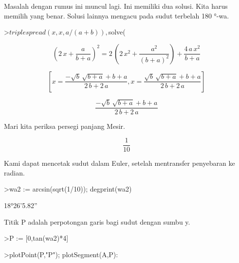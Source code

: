 \documentclass[a4paper,10pt]{article}
\begin{document}
\begin{eulernotebook}
\begin{eulercomment}
\begin{eulercomment}
\begin{eulercomment}
Masalah dengan rumus ini muncul lagi. Ini memiliki dua solusi. Kita
harus memilih yang benar. Solusi lainnya mengacu pada sudut terbelah
180 °-wa.
\end{eulercomment}
\begin{eulerprompt}
>$triplespread(x,x,a/(a+b)), $solve(%
\end{eulerprompt}
\begin{eulerformula}
\[
\left(2\,x+\frac{a}{b+a}\right)^2=2\,\left(2\,x^2+\frac{a^2}{\left(
 b+a\right)^2}\right)+\frac{4\,a\,x^2}{b+a}
\]
\end{eulerformula}
\begin{eulerformula}
\[
\left[ x=\frac{-\sqrt{b}\,\sqrt{b+a}+b+a}{2\,b+2\,a} , x=\frac{
 \sqrt{b}\,\sqrt{b+a}+b+a}{2\,b+2\,a} \right] 
\]
\end{eulerformula}
\begin{eulerformula}
\[
\frac{-\sqrt{b}\,\sqrt{b+a}+b+a}{2\,b+2\,a}
\]
\end{eulerformula}
\begin{eulercomment}
Mari kita periksa persegi panjang Mesir.
\end{eulercomment}
\begin{eulerformula}
\[
\frac{1}{10}
\]
\end{eulerformula}
\begin{eulercomment}
Kami dapat mencetak sudut dalam Euler, setelah mentransfer penyebaran
ke radian.
\end{eulercomment}
\begin{eulerprompt}
>wa2 := arcsin(sqrt(1/10)); degprint(wa2)
\end{eulerprompt}
\begin{euleroutput}
  18°26'5.82''
\end{euleroutput}
\begin{eulercomment}
Titik P adalah perpotongan garis bagi sudut dengan sumbu y.
\end{eulercomment}
\begin{eulerprompt}
>P := [0,tan(wa2)*4]
\end{eulerprompt}
\begin{euleroutput}
  [0,  1.33333]
\end{euleroutput}
\begin{eulerprompt}
>plotPoint(P,"P"); plotSegment(A,P):
\end{eulerprompt}

\end{eulercomment}
\end{eulercomment}
\end{eulernotebook}
\end{document}

